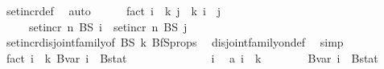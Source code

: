 \begin{isabellebody}
\ set{\isacharunderscore}{\kern0pt}incr{\isacharunderscore}{\kern0pt}def\ \isamarkupfalse%
\ auto\isanewline
\ \ \ \ \isamarkupfalse%
\ fact{}{\isacharcolon}{\kern0pt}\ {\isachardoublequoteopen}{\isasymforall}i\ {\isasymin}\ {\isacharbraceleft}{\kern0pt}{\isachardot}{\kern0pt}{\isachardot}{\kern0pt}{\isacharless}{\kern0pt}k{\isacharplus}{\kern0pt}{}{\isacharbraceright}{\kern0pt}{\isachardot}{\kern0pt}\ {\isasymforall}j\ {\isasymin}\ {\isacharbraceleft}{\kern0pt}{\isachardot}{\kern0pt}{\isachardot}{\kern0pt}{\isacharless}{\kern0pt}k{\isacharplus}{\kern0pt}{}{\isacharbraceright}{\kern0pt}{\isachardot}{\kern0pt}\ i\ {\isasymnoteq}\ j\isanewline
\ \ \ \ {\isasymlongrightarrow}\ set{\isacharunderscore}{\kern0pt}incr\ n\ {\isacharparenleft}{\kern0pt}BS\ i{\isacharparenright}{\kern0pt}\ {\isasyminter}\ set{\isacharunderscore}{\kern0pt}incr\ n\ {\isacharparenleft}{\kern0pt}BS\ j{\isacharparenright}{\kern0pt}\ {\isacharequal}{\kern0pt}\ {\isacharbraceleft}{\kern0pt}{\isacharbraceright}{\kern0pt}{\isachardoublequoteclose}\ \isanewline
\ \ \ \ \ \ \isamarkupfalse%
\ set{\isacharunderscore}{\kern0pt}incr{\isacharunderscore}{\kern0pt}disjoint{\isacharunderscore}{\kern0pt}family{\isacharbrackleft}{\kern0pt}of\ BS\ k{\isacharbrackright}{\kern0pt}\ BfS{\isacharunderscore}{\kern0pt}props\ \isamarkupfalse%
\ disjoint{\isacharunderscore}{\kern0pt}family{\isacharunderscore}{\kern0pt}on{\isacharunderscore}{\kern0pt}def\ \isamarkupfalse%
\ simp\ \isanewline
\ \ \ \ \isamarkupfalse%
\ fact{}{\isacharcolon}{\kern0pt}\ {\isachardoublequoteopen}{\isasymforall}i\ {\isasymin}\ {\isacharbraceleft}{\kern0pt}{\isachardot}{\kern0pt}{\isachardot}{\kern0pt}{\isacharless}{\kern0pt}k{\isacharplus}{\kern0pt}{}{\isacharbraceright}{\kern0pt}{\isachardot}{\kern0pt}\ Bvar\ i\ {\isasyminter}\ Bstat\ {\isacharequal}{\kern0pt}\ {\isacharbraceleft}{\kern0pt}{\isacharbraceright}{\kern0pt}{\isachardoublequoteclose}\isanewline
\ \ \ \ \isamarkupfalse%
\isanewline
\ \ \ \ \ \ \isamarkupfalse%
\ i\ \isamarkupfalse%
\ a{\isacharcolon}{\kern0pt}\ {\isachardoublequoteopen}i\ {\isasymin}\ {\isacharbraceleft}{\kern0pt}{\isachardot}{\kern0pt}{\isachardot}{\kern0pt}{\isacharless}{\kern0pt}k{\isacharplus}{\kern0pt}{}{\isacharbraceright}{\kern0pt}{\isachardoublequoteclose}\isanewline
\ \ \ \ \ \ \isamarkupfalse%
\ {\isachardoublequoteopen}Bvar\ i\ {\isasyminter}\ Bstat\ {\isacharequal}{\kern0pt}\ {\isacharbraceleft}{\kern0pt}{\isacharbraceright}{\kern0pt}{\isachardoublequoteclose}\isanewline

\end{isabellebody}
